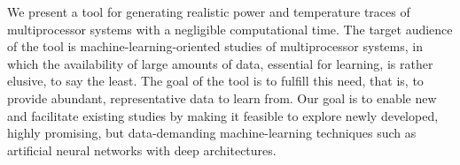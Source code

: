 We present a tool for generating realistic power and temperature traces of
multiprocessor systems with a negligible computational time. The target audience
of the tool is machine-learning-oriented studies of multiprocessor systems, in
which the availability of large amounts of data, essential for learning, is
rather elusive, to say the least. The goal of the tool is to fulfill this need,
that is, to provide abundant, representative data to learn from. Our goal is to
enable new and facilitate existing studies by making it feasible to explore
newly developed, highly promising, but data-demanding machine-learning
techniques such as artificial neural networks with deep architectures.
